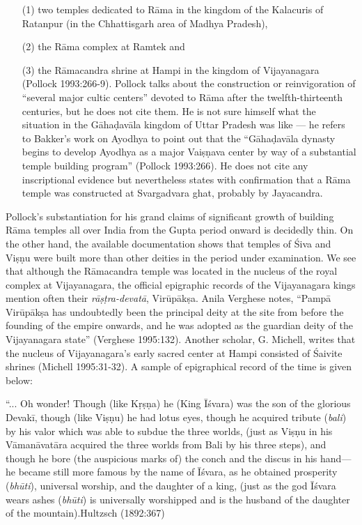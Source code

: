 \begin{itemize}
\item[(1)] two temples dedicated to Rāma in the kingdom of the Kalacuris of Ratanpur (in the Chhattisgarh area of Madhya Pradesh), 

\item[(2)] the Rāma complex at Ramtek and 

\item[(3)] the Rāmacandra shrine at Hampi in the kingdom of Vijayanagara  (Pollock 1993:266-9). Pollock talks about the construction or reinvigoration of “several major cultic centers” devoted to Rāma after the twelfth-thirteenth centuries, but he does not cite them. He is not sure himself what the situation in the Gāhaḍavāla kingdom of Uttar Pradesh was like — he refers to Bakker’s work on Ayodhya to point out that the “Gāhaḍavāla dynasty begins to develop Ayodhya as a major Vaiṣṇava center by way of a substantial temple building program” (Pollock 1993:266). He does not cite any inscriptional evidence but nevertheless states with confirmation that a Rāma temple was constructed at Svargadvara ghat, probably by Jayacandra. 
\end{itemize}

Pollock’s substantiation for his grand claims of significant growth of building Rāma temples all over India from the Gupta period onward is decidedly thin. On the other hand, the available documentation shows that temples of Śiva and Viṣṇu were built more than other deities in the period under examination. We see that although the Rāmacandra temple was located in the nucleus of the royal complex at Vijayanagara, the official epigraphic records of the Vijayanagara kings mention often their {\sl rāṣṭra-devatā}, Virūpākṣa. Anila Verghese notes, “Pampā Virūpākṣa has undoubtedly been the principal deity at the site from before the founding of the empire onwards, and he was adopted as the guardian deity of the Vijayanagara state” (Verghese 1995:132). Another scholar, G. Michell, writes that the nucleus of Vijayanagara’s early sacred center at Hampi consisted of Śaivite shrines (Michell 1995:31-32). A sample of epigraphical record of the time is given below:

\begin{myquote}
“...  Oh wonder! Though (like Kṛṣṇa) he (King Īśvara) was the son of the glorious Devakī, though (like Viṣṇu) he had lotus eyes, though he acquired tribute ({\sl bali}) by his valor which was able to subdue the three worlds, (just as Viṣṇu in his Vāmanāvatāra acquired the three worlds from Bali by his three steps), and though he bore (the auspicious marks of) the conch and the discus in his hand— he became still more famous by the name of Īśvara, as he obtained prosperity ({\sl bhūti}), universal worship, and the daughter of a king, (just as the god Īśvara wears ashes ({\sl bhūti}) is universally worshipped and is the husband of the daughter of the mountain).\hfill Hultzsch (1892:367)
\end{myquote}

